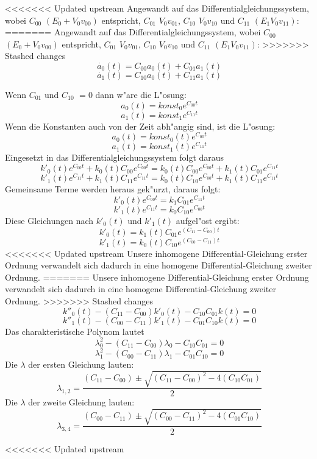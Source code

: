 \begin{refsection}
<<<<<<< Updated upstream
Angewandt auf das Differentialgleichungssystem, wobei $C_{00}$ $(E_{0} + V_{0} v_{00})$
entspricht, $C_{01}$ $V_{0} v_{01}$, $C_{10}$ $V_{0} v_{10}$ und $C_{11}$ $(E_{1} V_{0} v_{11})$:
=======
Angewandt auf das Differentialgleichungssystem, wobei $C_{00}$ $(E_{0} + V_{0} v_{00})$ entspricht, $C_{01}$ $V_{0} v_{01}$, $C_{10}$ $V_{0} v_{10}$ und $C_{11}$ $(E_{1} V_{0} v_{11})$:
>>>>>>> Stashed changes
\[
\ \dot{a_{0}}(t) = C_{00}a_{0}(t) + C_{01}a_{1}(t)
\]
\[
\ \dot{a_{1}}(t) = C_{10}a_{0}(t) + C_{11}a_{1}(t)
\]

Wenn $ C_{01}$ und $ C_{10}$ $ =0$ dann w"are die L"osung:
\[
\ a_{0}(t) = \text{$konst_{0}$} e^{C_{00} t} 
\]
\[
\ a_{1}(t) = \text{$konst_{1}$} e^{C_{11} t}
\]
Wenn die Konstanten auch von der Zeit abh"angig sind, ist die L"osung: 
\[
\ a_{0}(t) = \text{$konst_{0}(t)$} e^{C_{00} t} 
\]
\[
\ a_{1}(t) = \text{$konst_{1}(t)$} e^{C_{11} t} 
\]
Eingesetzt in das Differentialgleichungssystem folgt daraus
\[
\ k'_{0}(t) e^{C_{00} t} + k_{0}(t) C_{00} e^{C_{00} t} = k_{0}(t) C_{00} e^{C_{00} t} + k_{1}(t)C_{01}e^{C_{11} t}
\]
\[
\ k'_{1}(t) e^{C_{11} t} + k_{1}(t) C_{11} e^{C_{11} t} = k_{0}(t) C_{10} e^{C_{00} t} + k_{1}(t)C_{11}e^{C_{11} t}
\]
Gemeinsame Terme werden heraus gek"urzt, daraus folgt:
\[
\ k'_{0}(t) e^{C_{00} t} = k_{1} C_{01} e^{C_{11} t}
\]
\[
\ k'_{1}(t) e^{C_{11} t} = k_{0} C_{10} e^{C_{00} t}
\]
Diese Gleichungen nach $ k'_{0}(t)$ und $ k'_{1}(t)$ aufgel"ost ergibt:
\[
\ k'_{0}(t) = k_{1}(t) C_{01} e^{(C_{11}-C_{00}) t}
\]
\[
\ k'_{1}(t) = k_{0}(t) C_{10} e^{(C_{00}-C_{11}) t}
\]
<<<<<<< Updated upstream
Unsere inhomogene Differential-Gleichung erster Ordnung verwandelt
sich dadurch in eine homogene Differential-Gleichung zweiter Ordnung.
=======
Unsere inhomogene Differential-Gleichung erster Ordnung verwandelt sich dadurch in eine homogene Differential-Gleichung zweiter Ordnung.
>>>>>>> Stashed changes
\[ 
\ k''_{0}(t) - (C_{11}-C_{00}) k'_{0}(t) - C_{10}C_{01}k(t) = 0
\]
\[
\ k''_{1}(t) - (C_{00}-C_{11}) k'_{1}(t) - C_{01}C_{10}k(t) = 0
\]
Das charakteristische Polynom lautet
\[
\ \lambda_{0}^{2} - (C_{11}-C_{00})\lambda_{0} - C_{10}C_{01} = 0
\]
\[
\ \lambda_{1}^{2} - (C_{00}-C_{11})\lambda_{1} - C_{01}C_{10} = 0
\]
Die $ \lambda $ der ersten Gleichung lauten:
\[
\ \lambda_{1,2} = \frac{(C_{11}-C_{00})\pm \sqrt{(C_{11}-C_{00})^2-4(C_{10}C_{01})}}{2}
\]
Die $ \lambda $ der zweite Gleichung lauten:
\[
\ \lambda_{3,4} = \frac{(C_{00}-C_{11})\pm \sqrt{(C_{00}-C_{11})^2-4(C_{01}C_{10})}}{2}
\]

<<<<<<< Updated upstream

\end{refsection}
